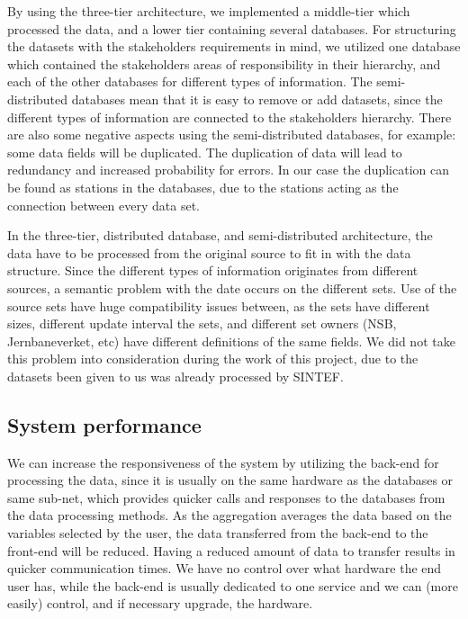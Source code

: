 By using the three-tier architecture, we implemented a middle-tier which 
processed the data, and a lower tier containing several databases. For
structuring the datasets with the stakeholders requirements in mind, we
utilized one database which contained the stakeholders areas of responsibility in
their hierarchy, and each of the other databases for different types of 
information. The semi-distributed databases mean that it is easy to remove or
add datasets, since the different types of information are connected to the
stakeholders hierarchy. There are also some negative aspects using
the semi-distributed databases, for example: some data fields
will be duplicated. The duplication of data will lead to redundancy and
increased probability for errors. In our case the duplication can be found as stations in the databases, due to the stations acting as the
connection between every data set. 

In the three-tier, distributed database, 
and semi-distributed architecture, the data have to be processed from the 
original source to fit in with the data structure. Since the different types of
information originates from different sources, a semantic problem with the date
occurs on the different sets. Use of the source sets have huge compatibility 
issues between, as the sets have different sizes, different update interval
the sets, and different set owners (NSB, Jernbaneverket, etc) have different
definitions of the same fields. We did not take this problem into consideration
during the work of this project, due to the datasets been given to us was 
already processed by SINTEF. 

\subsection{System performance} %
\label{sub:system_performance}
We can increase the responsiveness of the system by utilizing the back-end for 
processing the data, since it is usually on the same hardware as the databases or 
same sub-net, which provides quicker calls and responses to the databases from 
the data processing methods. As the aggregation averages the data based on the 
variables selected by the user, the data transferred from the back-end to the 
front-end will be reduced. Having a reduced amount of data to transfer results 
in quicker communication times. We 
have no control over what hardware the end user has, while the back-end 
is usually dedicated to one service and we can (more easily) control, and if 
necessary upgrade, the hardware.

